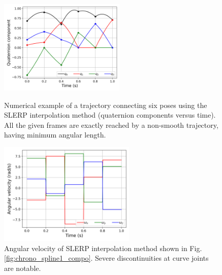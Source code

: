 \begin{figure}[tbp]
    \begin{minipage}[t]{0.49\textwidth}
        \centering
        \includegraphics[width=6cm]{figures/chrono_spline1_compo.png}
        \caption{Numerical example of a trajectory connecting six poses using the SLERP interpolation method (quaternion components versus time). All the given frames are exactly reached by a non-smooth trajectory, having minimum angular length.}
        \label{fig:chrono_spline1_compo}
    \end{minipage}
    \hfill
    \begin{minipage}[t]{0.49\textwidth}
        \centering
        \includegraphics[width=6.5cm]{figures/chrono_spline1_vel.png}
        \caption{Angular velocity of SLERP interpolation method shown in Fig. \ref{fig:chrono_spline1_compo}. Severe discontinuities at curve joints are notable.}
        \label{fig:chrono_spline1_vel}
    \end{minipage}
\end{figure}

